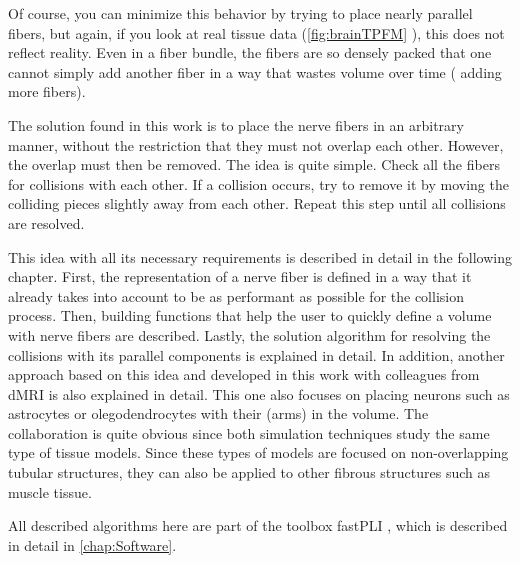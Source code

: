 Of course, you can minimize this behavior by trying to place nearly parallel fibers, but again, if you look at real tissue data (\cref{fig:brainTPFM} \dummy{}), this does not reflect reality.
Even in a fiber bundle, the fibers are so densely packed that one cannot simply add another fiber in a way that wastes volume over time (\ie{} adding more fibers).
\par
%
The solution found in this work is to place the nerve fibers in an arbitrary manner, without the restriction that they must not overlap each other.
However, the overlap must then be removed.
The idea is quite simple.
Check all the fibers for collisions with each other.
If a collision occurs, try to remove it by moving the colliding pieces slightly away from each other.
Repeat this step until all collisions are resolved.
\par
%
This idea \cite{Matuschke2019} with all its necessary requirements is described in detail in the following chapter.
First, the representation of a nerve fiber is defined in a way that it already takes into account to be as performant as possible for the collision process.
Then, building functions that help the user to quickly define a volume with nerve fibers are described.
Lastly, the solution algorithm for resolving the collisions with its parallel components is explained in detail.
In addition, another approach based on this idea and developed in this work with colleagues from \ac{dMRI} is also explained in detail.
This one also focuses on placing neurons such as astrocytes or olegodendrocytes with their (arms) in the volume.
The collaboration is quite obvious since both simulation techniques study the same type of tissue models.
Since these types of models are focused on non-overlapping tubular structures, they can also be applied to other fibrous structures such as muscle tissue.
\par
%
All described algorithms here are part of the toolbox \ac{fastPLI} \cite{Matuschke2021}, which is described in detail in \cref{chap:Software}.
%
%
%
